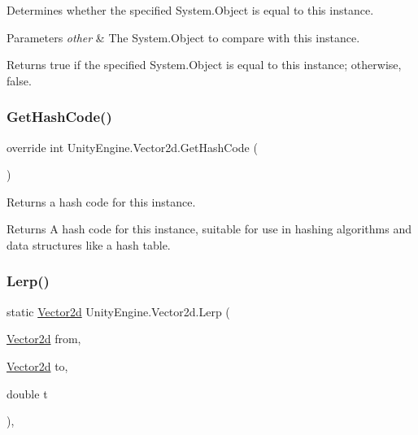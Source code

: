 Determines whether the specified System.\+Object is equal to this instance. 


\begin{DoxyParams}{Parameters}
{\em other} & The System.\+Object to compare with this instance.\\
\hline
\end{DoxyParams}
\begin{DoxyReturn}{Returns}
{\ttfamily true} if the specified System.\+Object is equal to this instance; otherwise, {\ttfamily false}.
\end{DoxyReturn}
\mbox{\label{struct_unity_engine_1_1_vector2d_a936fb816c2313d3578248b643a9a1b8e}} 
\subsubsection{\texorpdfstring{Get\+Hash\+Code()}{GetHashCode()}}
{\footnotesize\ttfamily override int Unity\+Engine.\+Vector2d.\+Get\+Hash\+Code (\begin{DoxyParamCaption}{ }\end{DoxyParamCaption})\hspace{0.3cm}{\ttfamily [inline]}}



Returns a hash code for this instance. 

\begin{DoxyReturn}{Returns}
A hash code for this instance, suitable for use in hashing algorithms and data structures like a hash table.
\end{DoxyReturn}
\mbox{\label{struct_unity_engine_1_1_vector2d_a17b30495c218cfee9ed164585a74c67a}} 
\subsubsection{\texorpdfstring{Lerp()}{Lerp()}}
{\footnotesize\ttfamily static \hyperlink{struct_unity_engine_1_1_vector2d}{Vector2d} Unity\+Engine.\+Vector2d.\+Lerp (\begin{DoxyParamCaption}\item[{\hyperlink{struct_unity_engine_1_1_vector2d}{Vector2d}}]{from,  }\item[{\hyperlink{struct_unity_engine_1_1_vector2d}{Vector2d}}]{to,  }\item[{double}]{t }\end{DoxyParamCaption})\hspace{0.3cm}{\ttfamily [inline]}, {\ttfamily [static]}}



